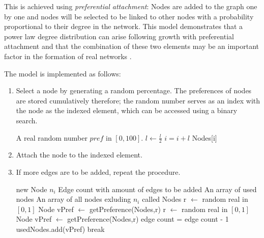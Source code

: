 \documentclass[a4paper,11pt,titlepage]{article}
\begin{document}
This is achieved using \emph{preferential attachment}: Nodes are added to
the graph one by one and nodes will be selected to be linked to other nodes with
a probability proportional to their degree in the network. This model
demonstrates that a power law degree distribution can arise following growth
with preferential attachment and that the combination of these two elements
may be an important factor in the formation of real networks \cite{oconn11}.

The model is implemented as follows:


\begin{enumerate}
\item
  Select a node by generating a random percentage. The preferences of nodes are
  stored cumulatively therefore; the random number serves as an index with the
  node as the indexed element, which can be accessed using a binary search.
  \begin{algorithmic}
    \REQUIRE A real random number $pref$ in $[0,100]$.
        \STATE $l \gets \frac{l}{2}$
            \STATE $i = i+l$
          \ENDIF
        \ENDIF
      \ENDFOR
    \ENDFOR
    \RETURN Nodes[i]
  \end{algorithmic}

  \item Attach the node to the indexed element.

  \item If more edges are to be added, repeat the procedure.
  \begin{algorithmic}
    \REQUIRE new Node $n_i$
    \REQUIRE Edge count with amount of edges to be added
    \REQUIRE An array of used nodes
    \REQUIRE An array of all nodes exluding $n_i$ called Nodes
      \STATE r $\gets$ random real in $[0, 1]$
      \STATE Node vPref $\gets$ getPreference(Nodes,r)
        \STATE r $\gets$ random real in $[0, 1]$
        \STATE Node vPref $\gets$ getPreference(Nodes,r)
      \ENDWHILE
      \STATE edge count = edge count - 1
      \STATE usedNodes.add(vPref)
        \STATE break
      \ENDIF
    \ENDWHILE
  \end{algorithmic}
\end{enumerate}
\end{document}
